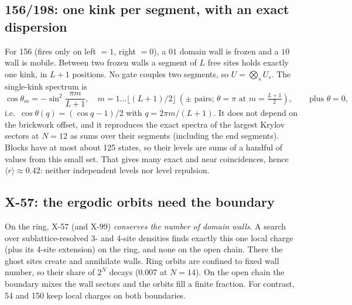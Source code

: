 \subsection{156/198: one kink per segment, with an exact dispersion}
For 156 (fires only on left $=1$, right $=0$), a $01$ domain wall is frozen and a $10$ wall is mobile. Between two frozen
walls a segment of $L$ free sites holds exactly one kink, in $L+1$ positions. No gate couples two segments, so
$U=\bigotimes_s U_s$. The single-kink spectrum is
\begin{equation}
  \cos\theta_m=-\sin^2\!\frac{\pi m}{L+1},\quad m=1\ldots\lfloor(L+1)/2\rfloor\ (\pm\text{ pairs; }\theta=\pi\text{ at }m=\tfrac{L+1}{2}),
  \qquad\text{plus }\theta=0,
\end{equation}
i.e.\ $\cos\theta(q)=(\cos q-1)/2$ with $q=2\pi m/(L+1)$. It does not depend on the brickwork offset, and it reproduces
the exact spectra of the largest Krylov sectors at $N=12$ as sums over their segments (including the end segments).
Blocks have at most about 125 states, so their levels are sums of a handful of values from this small set. That gives
many exact and near coincidences, hence $\langle r\rangle\approx0.42$: neither independent levels nor level repulsion.

\subsection{X-57: the ergodic orbits need the boundary}
On the ring, X-57 (and X-99) \emph{conserves the number of domain walls}. A search over sublattice-resolved 3- and
4-site densities finds exactly this one local charge (plus its 4-site extension) on the ring, and none on the open
chain. There the ghost sites create and annihilate walls. Ring orbits are confined to fixed wall number, so their share
of $2^N$ decays (0.007 at $N=14$). On the open chain the boundary mixes the wall sectors and the orbits fill a finite
fraction. For contrast, 54 and 150 keep local charges on both boundaries.

